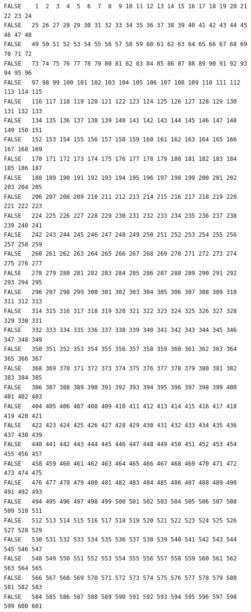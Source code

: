 \documentclass[]{article}
\begin{document}
\begin{verbatim}
FALSE    1  2  3  4  5  6  7  8  9 10 11 12 13 14 15 16 17 18 19 20 21 22 23 24
FALSE   25 26 27 28 29 30 31 32 33 34 35 36 37 38 39 40 41 42 43 44 45 46 47 48
FALSE   49 50 51 52 53 54 55 56 57 58 59 60 61 62 63 64 65 66 67 68 69 70 71 72
FALSE   73 74 75 76 77 78 79 80 81 82 83 84 85 86 87 88 89 90 91 92 93 94 95 96
FALSE   97 98 99 100 101 102 103 104 105 106 107 108 109 110 111 112 113 114 115
FALSE   116 117 118 119 120 121 122 123 124 125 126 127 128 129 130 131 132 133
FALSE   134 135 136 137 138 139 140 141 142 143 144 145 146 147 148 149 150 151
FALSE   152 153 154 155 156 157 158 159 160 161 162 163 164 165 166 167 168 169
FALSE   170 171 172 173 174 175 176 177 178 179 180 181 182 183 184 185 186 187
FALSE   188 189 190 191 192 193 194 195 196 197 198 199 200 201 202 203 204 205
FALSE   206 207 208 209 210 211 212 213 214 215 216 217 218 219 220 221 222 223
FALSE   224 225 226 227 228 229 230 231 232 233 234 235 236 237 238 239 240 241
FALSE   242 243 244 245 246 247 248 249 250 251 252 253 254 255 256 257 258 259
FALSE   260 261 262 263 264 265 266 267 268 269 270 271 272 273 274 275 276 277
FALSE   278 279 280 281 282 283 284 285 286 287 288 289 290 291 292 293 294 295
FALSE   296 297 298 299 300 301 302 303 304 305 306 307 308 309 310 311 312 313
FALSE   314 315 316 317 318 319 320 321 322 323 324 325 326 327 328 329 330 331
FALSE   332 333 334 335 336 337 338 339 340 341 342 343 344 345 346 347 348 349
FALSE   350 351 352 353 354 355 356 357 358 359 360 361 362 363 364 365 366 367
FALSE   368 369 370 371 372 373 374 375 376 377 378 379 380 381 382 383 384 385
FALSE   386 387 388 389 390 391 392 393 394 395 396 397 398 399 400 401 402 403
FALSE   404 405 406 407 408 409 410 411 412 413 414 415 416 417 418 419 420 421
FALSE   422 423 424 425 426 427 428 429 430 431 432 433 434 435 436 437 438 439
FALSE   440 441 442 443 444 445 446 447 448 449 450 451 452 453 454 455 456 457
FALSE   458 459 460 461 462 463 464 465 466 467 468 469 470 471 472 473 474 475
FALSE   476 477 478 479 480 481 482 483 484 485 486 487 488 489 490 491 492 493
FALSE   494 495 496 497 498 499 500 501 502 503 504 505 506 507 508 509 510 511
FALSE   512 513 514 515 516 517 518 519 520 521 522 523 524 525 526 527 528 529
FALSE   530 531 532 533 534 535 536 537 538 539 540 541 542 543 544 545 546 547
FALSE   548 549 550 551 552 553 554 555 556 557 558 559 560 561 562 563 564 565
FALSE   566 567 568 569 570 571 572 573 574 575 576 577 578 579 580 581 582 583
FALSE   584 585 586 587 588 589 590 591 592 593 594 595 596 597 598 599 600 601

\end{verbatim}
\end{document}
